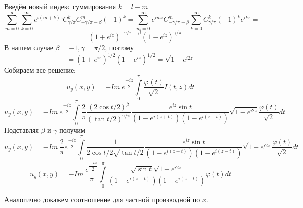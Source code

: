 \documentclass[12pt, a4paper]{article}
\begin{document}
	Введём новый индекс суммирования $k = l -m$
	\begin{equation*}
		\sum\limits_{m=0}^{\infty} \sum\limits_{k=0}^{\infty} e^{i(m+k)z} C^{k}_{\gamma/\pi} C^{m}_{-\gamma/\pi - \beta} (-1)^{k} = \sum\limits_{m=0}^{\infty} e^{imz} C^{m}_{-\gamma/\pi - \beta} \sum\limits_{k=0}^{\infty}  C^{k}_{\gamma/\pi} (-1)^k e^{ikz} = 
	\end{equation*}
	\begin{equation*}
		= (1 + e^{iz})^{-\gamma/\pi - \beta} (1- e^{iz})^{\gamma/\pi} 
	\end{equation*}
	В нашем случае $\beta = -1, \gamma = \pi/2$, поэтому
	\begin{equation*}
		= (1 + e^{iz})^{1/2} (1- e^{iz})^{1/2} =\sqrt{1 - e^{i2z}} 
	\end{equation*}
	Собираем все решение:
	\begin{equation*}
		u_y(x,y) = - Im\ e^{\dfrac{-iz}{2}} \int\limits_0^\pi \dfrac{\varphi(t)}{\sqrt2} I(t,z) dt 
	\end{equation*}
	\begin{equation*}
		u_y(x,y) = - Im\ e^{\dfrac{-iz}{2}} \int\limits_0^\pi \dfrac{2}{\pi}\dfrac{(2\cos{t/2})^\beta}{(\tan{t/2})^{\gamma/\pi}}  \dfrac{e^{iz} \sin{t}}{\left(1 - e^{i(z+t)} \right) \left(1 - e^{i(z-t)}\right)} \sqrt{1 - e^{i2z}} \dfrac{\varphi(t)}{\sqrt2} dt
	\end{equation*}
	Подставляя $\beta$ и $\gamma$ получим
	\begin{equation*}
		u_y(x,y) = - Im\  \dfrac{2}{\pi} e^{\dfrac{-iz}{2}} \int\limits_0^\pi \dfrac{1}{2\cos{t/2} \sqrt{\tan{t/2}}}  \dfrac{e^{iz} \sin{t}}{\left(1 - e^{i(z+t)} \right) \left(1 - e^{i(z-t)}\right)} \sqrt{1 - e^{i2z}} \dfrac{\varphi(t)}{\sqrt2} dt
	\end{equation*}
	\begin{equation*}
		u_y(x,y) = - Im\  \dfrac{e^{\dfrac{+iz}{2}}}{\pi}  \int\limits_0^\pi  \dfrac{\sqrt{\sin{t}} \sqrt{1 - e^{i2z}}}{\left(1 - e^{i(z+t)} \right) \left(1 - e^{i(z-t)}\right)}  \varphi(t) dt
	\end{equation*}
	
	Аналогично докажем соотношение для частной производной по $x$.
	
\end{document}
